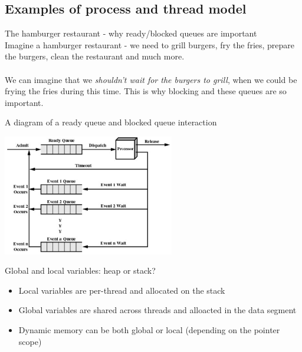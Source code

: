 \documentclass[journal, letterpaper]{IEEEtran}
\begin{document}
\subsection{Examples of process and thread model}
\begin{example}{The hamburger restaurant - why ready/blocked queues are important} \\ 
    Imagine a hamburger restaurant - we need to grill burgers, fry the fries, prepare the burgers,
    clean the restaurant and much more. \\ \\ 
    We can imagine that we \textit{shouldn't wait for the burgers to grill}, when we could be frying the fries during this time. This is why blocking and these queues are so important.
\end{example}
\begin{example}{A diagram of a ready queue and blocked queue interaction}
    \begin{center}
        \includegraphics[width=7.5cm]{./photos/ready_blocked.png}
    \end{center}
\end{example}
\begin{aside}{Global and local variables: heap or stack?}
    \begin{itemize}
        \item Local variables are per-thread and allocated on the stack
        \item Global variables are shared across threads and alloacted in the data segment
        \item Dynamic memory can be both global or local (depending on the pointer scope)
    \end{itemize}
\end{aside}
\end{document}

